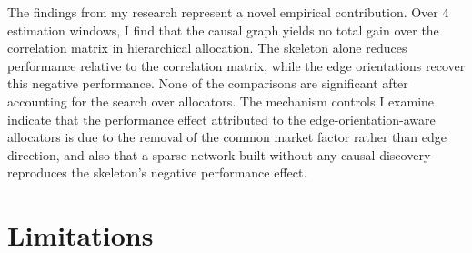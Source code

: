 \documentclass[11pt, a4paper]{report}
\begin{document}
\begin{itemize}[itemsep=2pt]
        The findings from my research represent a novel empirical contribution.
        Over 4 estimation windows, I find that the causal graph yields no
        total gain over the correlation matrix in hierarchical allocation. The skeleton alone reduces performance relative to the
        correlation matrix, while the edge orientations
        recover this negative performance. None of the comparisons are significant after accounting for the search over allocators. The
        mechanism controls I examine indicate that the performance effect attributed to the edge-orientation-aware allocators is due to the removal of the common market factor rather than edge direction, and also that a sparse network built without any causal discovery reproduces the skeleton's negative performance effect.
\end{itemize}

\section{Limitations}
\label{sec:limitations}
\end{document}
